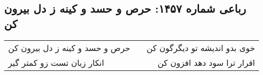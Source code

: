 \begin{center}
\section*{رباعی شماره ۱۴۵۷: حرص و حسد و کینه ز دل بیرون کن}
\label{sec:1457}
\begin{longtable}{l p{0.5cm} r}
حرص و حسد و کینه ز دل بیرون کن
&&
خوی بدو اندیشه تو دیگرگون کن
\\
انکار زیان تست زو کمتر گیر
&&
اقرار ترا سود دهد افزون کن
\\
\end{longtable}
\end{center}
